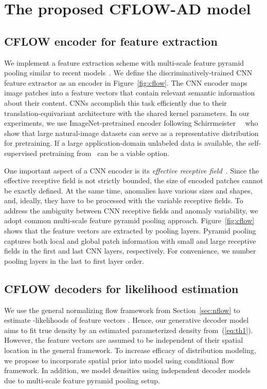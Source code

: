 \documentclass[10pt,twocolumn,letterpaper]{article}
\begin{document}
\section{The proposed CFLOW-AD model}
\label{sec:our_nf}
\subsection{CFLOW encoder for feature extraction}
\label{sec:our_encoder}
We implement a feature extraction scheme with multi-scale feature pyramid pooling similar to recent models~\cite{cohen2021subimage, defard2020padim}. We define the discriminatively-trained CNN feature extractor as an encoder  in Figure~\ref{fig:cflow}. The CNN encoder maps image patches  into a feature vectors  that contain relevant semantic information about their content. CNNs accomplish this task efficiently due to their translation-equivariant architecture with the shared kernel parameters. In our experiments, we use ImageNet-pretrained encoder following Schirrmeister~\etal~\cite{schirrmeister2020understanding} who show that large natural-image datasets can serve as a representative distribution for pretraining. If a large application-domain unlabeled data is available, the self-supervised pretraining from~\cite{Yi_2020_ACCV, li2021cutpaste} can be a viable option.

One important aspect of a CNN encoder is its \textit{effective receptive field}~\cite{NIPS2016_c8067ad1}. Since the effective receptive field is not strictly bounded, the size of encoded patches  cannot be exactly defined. At the same time, anomalies have various sizes and shapes, and, ideally, they have to be processed with the variable receptive fields. To address the ambiguity between CNN receptive fields and anomaly variability, we adopt common multi-scale feature pyramid pooling approach. Figure~\ref{fig:cflow} shows that the feature vectors  are extracted by  pooling layers. Pyramid pooling captures both local and global patch information with small and large receptive fields in the first and last CNN layers, respectively. For convenience, we number pooling layers in the last to first layer order.

\subsection{CFLOW decoders for likelihood estimation}
\label{sec:our_decoder}
We use the general normalizing flow framework from Section~\ref{sec:nflow} to estimate -likelihoods of feature vectors . Hence, our generative decoder model  aims to fit true density  by an estimated parameterized density  from~(\ref{eq:th1}). However, the feature vectors are assumed to be independent of their spatial location in the general framework. To increase efficacy of distribution modeling, we propose to incorporate spatial prior into  model using conditional flow framework. In addition, we model  densities using  independent decoder models  due to multi-scale feature pyramid pooling setup.
\end{document}

